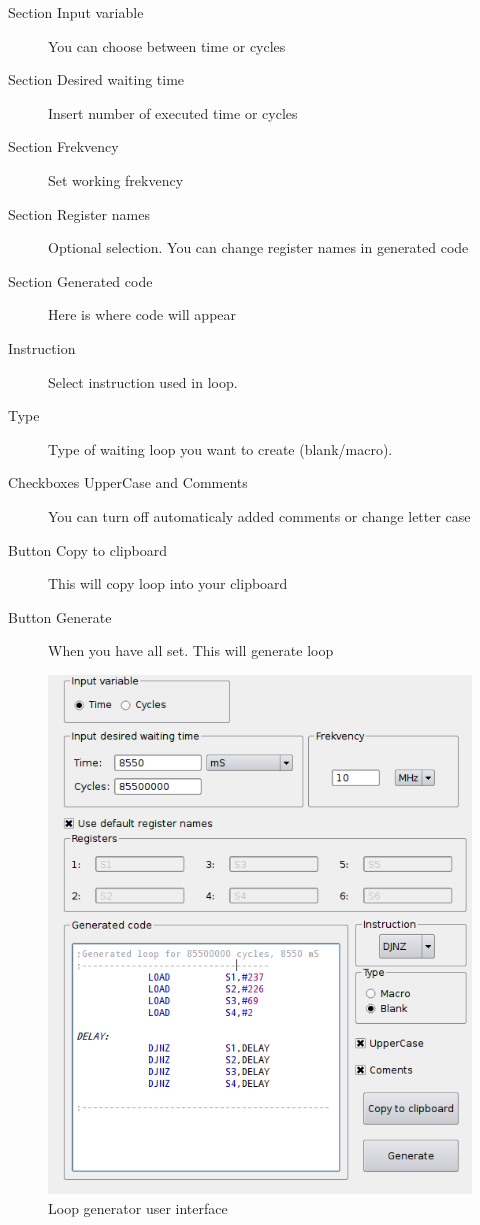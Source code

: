     \begin{description}
        \item[Section Input variable] You can choose between time or cycles
        \item[Section Desired waiting time] Insert number of executed time or cycles 
        \item[Section Frekvency] Set working frekvency 
        \item[Section Register names] Optional selection. You can change register names in generated code
        \item[Section Generated code] Here is where code will appear
        \item[Instruction] Select instruction used in loop.
        \item[Type] Type of waiting loop you want to create (blank/macro).
        \item[Checkboxes UpperCase and Comments]  You can turn off automaticaly added comments or change letter case
        \item[Button Copy to clipboard] This will copy loop into your clipboard
        \item[Button Generate] When you have all set. This will generate loop
    \end{description}

    \begin{figure}[h]
        \centering{}
        \includegraphics[width=.7\textwidth]{img/loop_gen.png}
        \caption{Loop generator user interface}
    \end{figure}

